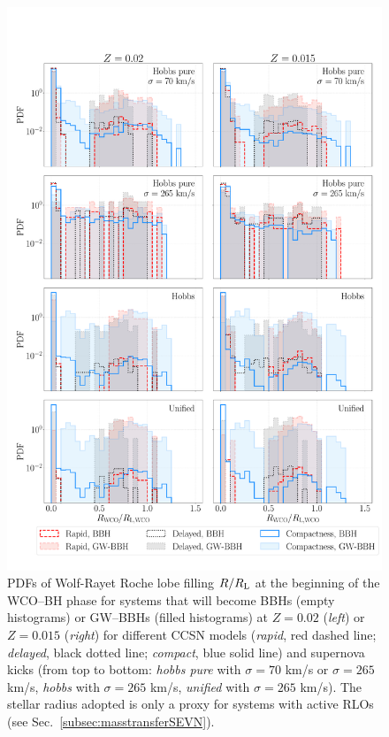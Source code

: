 \documentclass[a4paper,titlepage]{book}     	%
\begin{document}
\begin{appendices}
\begin{figure}
	\centering
	\includegraphics[width=\textwidth]{./images/WRBH-RLfillpureHe.pdf}	
	\caption{PDFs of Wolf-Rayet Roche lobe filling $R/R_{\rm L}$ at the beginning of the WCO--BH phase for systems that will become BBHs (empty histograms) or GW--BBHs (filled histograms) at $Z=0.02$ (\emph{left}) or $Z=0.015$ (\emph{right}) for different CCSN models (\emph{rapid}, red dashed line; \emph{delayed}, black dotted line; \emph{compact}, blue solid line) and supernova kicks (from top to bottom: \emph{hobbs pure} with $\sigma = 70$ km/s or $\sigma = 265$ km/s, \emph{hobbs} with $\sigma = 265$ km/s, \emph{unified} with $\sigma = 265$ km/s). The stellar radius adopted is only a proxy for systems with active RLOs (see Sec.\ \ref{subsec:masstransferSEVN}).}\label{fig:resultsWRBH-RLfillpureHe}
\end{figure}


\end{appendices}
\end{document}
